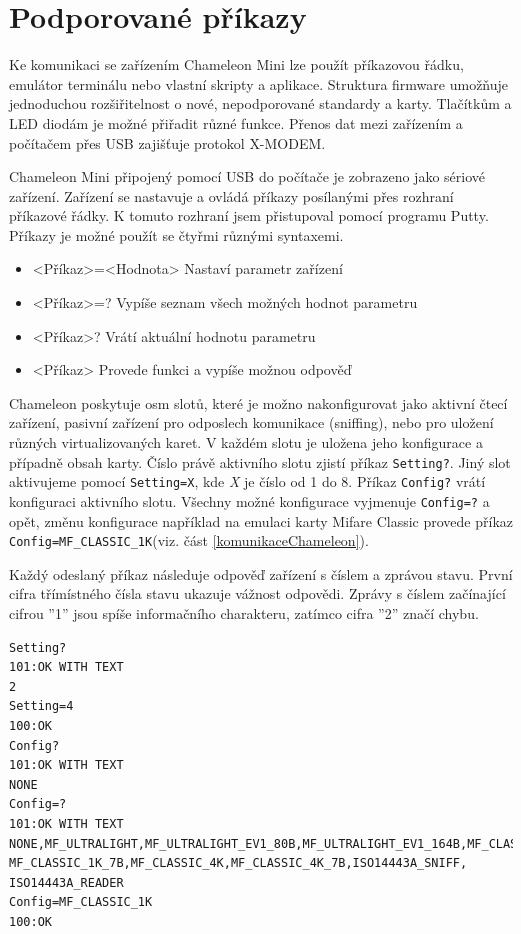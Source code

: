 \section{Podporované příkazy}
Ke komunikaci se zařízením Chameleon Mini lze použít příkazovou řádku, emulátor terminálu nebo vlastní skripty a aplikace. Struktura firmware umožňuje jednoduchou rozšiřitelnost o nové, nepodporované standardy a karty. Tlačítkům a LED diodám je možné přiřadit různé funkce. Přenos dat mezi zařízením a počítačem přes USB zajišťuje protokol {X-MODEM}. \cite{ChameleonKickStarter}
\par
Chameleon Mini připojený pomocí USB do počítače je zobrazeno jako sériové zařízení. Zařízení se nastavuje a ovládá příkazy posílanými přes rozhraní příkazové řádky. K tomuto rozhraní jsem přistupoval pomocí programu Putty. Příkazy je možné použít se čtyřmi různými syntaxemi.
\begin{itemize}
  \item <Příkaz>=<Hodnota> Nastaví parametr zařízení
  \item <Příkaz>=? Vypíše seznam všech možných hodnot parametru
  \item <Příkaz>? Vrátí aktuální hodnotu parametru
  \item <Příkaz> Provede funkci a vypíše možnou odpověď
\end{itemize}
Chameleon poskytuje osm slotů, které je možno nakonfigurovat jako aktivní čtecí zařízení, pasivní zařízení pro odposlech komunikace (sniffing), nebo pro uložení různých virtualizovaných karet. V každém slotu je uložena jeho konfigurace a případně obsah karty. Číslo právě aktivního slotu zjistí příkaz \verb|Setting?|. Jiný slot aktivujeme pomocí \verb|Setting=X|, kde \emph{X} je číslo od 1 do 8. Příkaz \verb|Config?| vrátí konfiguraci aktivního slotu. Všechny možné konfigurace vyjmenuje \verb|Config=?| a opět, změnu konfigurace například na emulaci karty Mifare Classic provede příkaz \verb|Config=MF_CLASSIC_1K|(viz. část \ref{komunikaceChameleon}). \par 
Každý odeslaný příkaz následuje odpověď zařízení s číslem a zprávou stavu. První cifra třímístného čísla stavu ukazuje vážnost odpovědi. Zprávy s číslem začínající cifrou ''1'' jsou spíše  informačního charakteru, zatímco cifra ''2'' značí chybu.\cite{ChameleonDocs}

\begin{lstlisting}[caption=Záznam komunikace se zařízením Chameleon Mini, label={komunikaceChameleon}]
Setting?
101:OK WITH TEXT
2
Setting=4
100:OK
Config?
101:OK WITH TEXT
NONE
Config=?
101:OK WITH TEXT
NONE,MF_ULTRALIGHT,MF_ULTRALIGHT_EV1_80B,MF_ULTRALIGHT_EV1_164B,MF_CLASSIC_1K,
MF_CLASSIC_1K_7B,MF_CLASSIC_4K,MF_CLASSIC_4K_7B,ISO14443A_SNIFF,
ISO14443A_READER
Config=MF_CLASSIC_1K
100:OK
\end{lstlisting}

